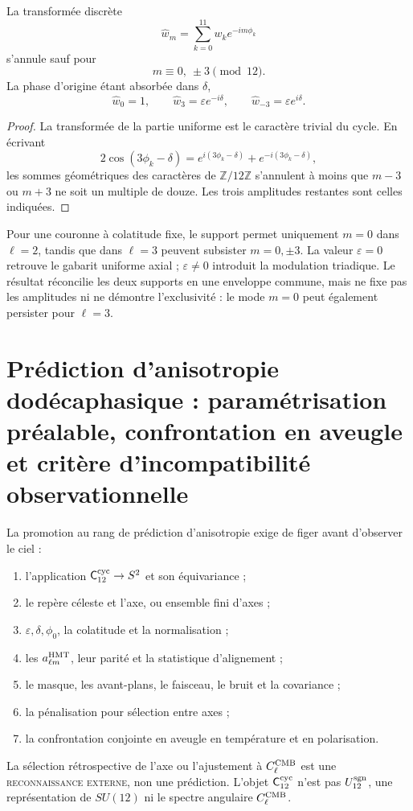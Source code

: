 \begin{theorem}
\label{thm:soporte-fourier-dodecafasico}
La transformée discrète
\[
 \widehat w_m=\sum_{k=0}^{11}w_ke^{-im\phi_k}
\]
s'annule sauf pour
\[
 m\equiv0,\ \pm3\pmod{12}.
\]
La phase d'origine étant absorbée dans \(\delta\),
\[
 \widehat w_0=1,\qquad
 \widehat w_3=\varepsilon e^{-i\delta},\qquad
 \widehat w_{-3}=\varepsilon e^{i\delta}.
\]
\end{theorem}

\begin{proof}
La transformée de la partie uniforme est le caractère trivial du cycle. En
écrivant
\[
 2\cos(3\phi_k-\delta)
 =e^{i(3\phi_k-\delta)}+e^{-i(3\phi_k-\delta)},
\]
les sommes géométriques des caractères de \(\mathbb Z/12\mathbb Z\)
s'annulent à moins que \(m-3\) ou \(m+3\) ne soit un multiple de douze. Les trois
amplitudes restantes sont celles indiquées.
\end{proof}

Pour une couronne à colatitude fixe, le support permet uniquement \(m=0\) dans
\(\ell=2\), tandis que dans \(\ell=3\) peuvent subsister
\(m=0,\pm3\). La valeur \(\varepsilon=0\) retrouve le gabarit uniforme
axial ; \(\varepsilon\neq0\) introduit la modulation triadique. Le résultat
réconcilie les deux supports en une enveloppe commune, mais ne fixe pas les amplitudes
ni ne démontre l'exclusivité : le mode \(m=0\) peut également persister pour
\(\ell=3\).

\section{Prédiction d'anisotropie dodécaphasique : paramétrisation préalable, confrontation en aveugle et critère d'incompatibilité observationnelle}
\label{sec:interfaz-cosmologica-c12}

La promotion au rang de prédiction d'anisotropie exige de figer avant d'observer
le ciel :
\begin{enumerate}
 \item l'application \(\mathsf C_{12}^{\rm cyc}\to S^2\) et son équivariance ;
 \item le repère céleste et l'axe, ou ensemble fini d'axes ;
 \item \(\varepsilon,\delta,\phi_0\), la colatitude et la normalisation ;
 \item les \(a_{\ell m}^{\rm HMT}\), leur parité et la statistique
 d'alignement ;
 \item le masque, les avant-plans, le faisceau, le bruit et la covariance ;
 \item la pénalisation pour sélection entre axes ;
 \item la confrontation conjointe en aveugle en température et en polarisation.
\end{enumerate}
La sélection rétrospective de l'axe ou l'ajustement à \(C_\ell^{\rm CMB}\) est une
\textsc{reconnaissance externe}, non une prédiction. L'objet
\(\mathsf C_{12}^{\rm cyc}\) n'est pas \(U_{12}^{\rm sgn}\), une
représentation de \(SU(12)\) ni le spectre angulaire
\(C_\ell^{\rm CMB}\).

